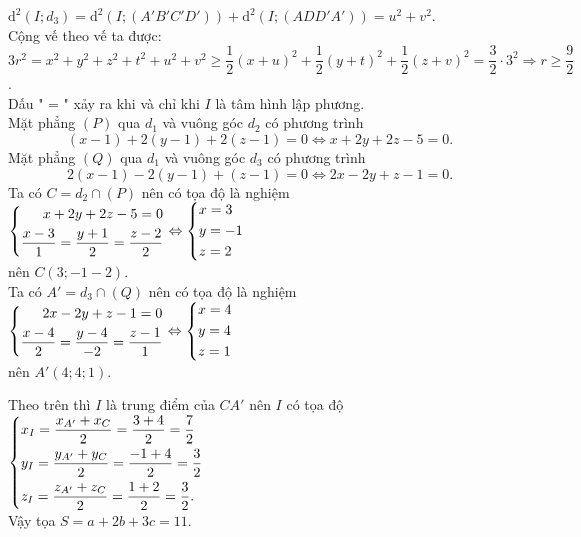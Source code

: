 \begin{ex}
{{
		}
	$\mathrm{d}^2\left(I;d_3 \right) =\mathrm{d}^2\left(I;(A'B'C'D')\right) +\mathrm{d}^2\left(I;(ADD'A')\right) =u^2+v^2$.\\
Cộng vế theo vế ta được:\\
$3r^2=x^2+y^2+z^2+t^2+u^2+v^2\ge\dfrac{1}{2}(x+u)^2+ \dfrac{1}{2}(y+t)^2+\dfrac{1}{2}(z+v)^2=\dfrac{3}{2}\cdot 3^2\Rightarrow r\ge \dfrac{9}{2}$	.\\
Dấu " = " xảy ra khi và chỉ khi $I$ là tâm hình lập phương.\\
Mặt phẳng $(P)$ qua $d_1$ và vuông góc $d_2$ có phương trình $$(x-1)+2(y-1)+2(z-1)=0\Leftrightarrow x+2y+2z-5=0.$$
Mặt phẳng $(Q)$ qua $d_1$ và vuông góc $d_3$ có phương trình $$2(x-1)-2(y-1)+(z-1)=0\Leftrightarrow 2x-2y+z-1=0.$$
Ta có $C= d_2 \cap (P)$ nên có tọa độ là nghiệm $\left\{\begin{aligned}x+2y+2z-5=0\\
\dfrac{x-3}{1}=\dfrac{y+1}{2}=\dfrac{z-2}{2}\end{aligned}\right.\Leftrightarrow \left\{\begin{aligned}&x=3\\&y=-1\\&z=2\end{aligned}\right.$\\
nên $C(3;-1-2)$.\\
Ta có $A'= d_3 \cap (Q)$ nên có tọa độ là nghiệm $\left\{\begin{aligned}2x-2y+z-1=0\\
	\dfrac{x-4}{2}=\dfrac{y-4}{-2}=\dfrac{z-1}{1}\end{aligned}\right.\Leftrightarrow \left\{\begin{aligned}&x=4\\&y=4\\&z=1\end{aligned}\right.$\\
nên $A'(4;4;1)$.

Theo trên thì $I$ là trung điểm của $CA'$ nên $I$ có tọa độ $\left\{\begin{aligned}&x_I=\dfrac{x_{A'}+x_C}{2}=\dfrac{3+4}{2}=\dfrac{7}{2}\\
&y_I=\dfrac{y_{A'}+y_C}{2}=\dfrac{-1+4}{2}=\dfrac{3}{2}\\
&z_I=\dfrac{z_{A'}+z_C}{2}=\dfrac{1+2}{2}=\dfrac{3}{2}.\end{aligned}\right.$\\
Vậy tọa $S=a+2b+3c= 11.$

	}
\end{ex}

